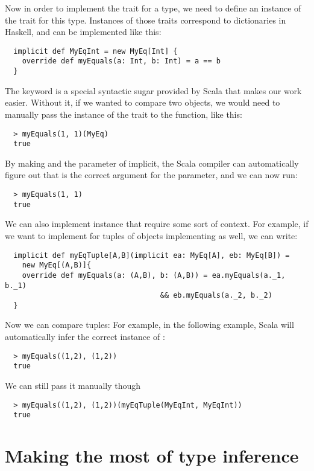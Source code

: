 Now in order to implement the trait for a type, we need to define an instance
of the trait for this type. Instances of those traits correspond to dictionaries
in Haskell, and can be implemented like this:
\begin{lstlisting}
  implicit def MyEqInt = new MyEq[Int] {
    override def myEquals(a: Int, b: Int) = a == b
  }
\end{lstlisting}
The  keyword is a special syntactic sugar provided by Scala
that makes our work easier. Without it, if we wanted to compare two objects,
we would need to manually pass the instance of the trait to the function,
like this:
\begin{lstlisting}
  > myEquals(1, 1)(MyEq)
  true
\end{lstlisting}
By making  and the  parameter of  implicit,
the Scala compiler can automatically figure out that  is the
correct argument for the  parameter, and we can now run:
\begin{lstlisting}
  > myEquals(1, 1)
  true
\end{lstlisting}


We can also implement instance that require some sort of context. For
example, if we want to implement  for tuples of objects implementing
 as well, we can write:
\begin{lstlisting}
  implicit def myEqTuple[A,B](implicit ea: MyEq[A], eb: MyEq[B]) =
    new MyEq[(A,B)]{
    override def myEquals(a: (A,B), b: (A,B)) = ea.myEquals(a._1, b._1)
                                    && eb.myEquals(a._2, b._2)
  }
\end{lstlisting}
Now we can compare tuples: For example, in the following example, Scala will
automatically infer the correct instance of :
\begin{lstlisting}
  > myEquals((1,2), (1,2))
  true
\end{lstlisting}
We can still pass  it manually though
\begin{lstlisting}
  > myEquals((1,2), (1,2))(myEqTuple(MyEqInt, MyEqInt))
  true
\end{lstlisting}

\section{Making the most of type inference}
\label{type-inference}

